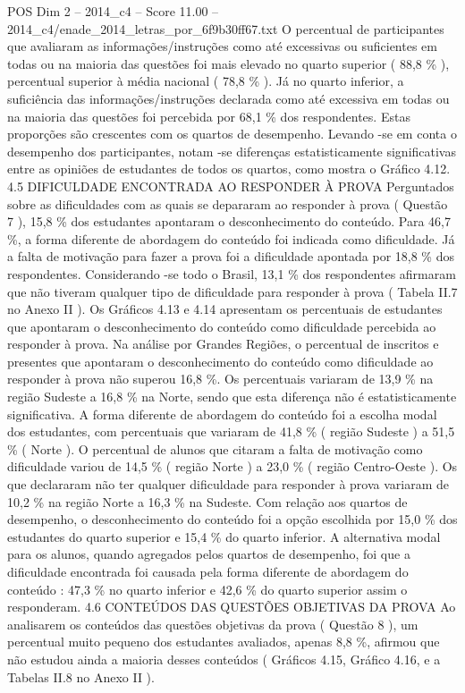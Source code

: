 \begin{textsample}{POS Dim 2 – 2014\_c4 – Score 11.00 – 2014\_c4/enade\_2014\_letras\_por\_6f9b30ff67.txt}
O percentual de participantes que avaliaram as informações/instruções como até excessivas ou suficientes em todas ou na maioria das questões foi mais elevado no quarto superior ( 88,8 \% ), percentual superior à média nacional ( 78,8 \% ).
Já no quarto inferior, a suficiência das informações/instruções declarada como até excessiva em todas ou na maioria das questões foi percebida por 68,1 \% dos respondentes.
Estas proporções são crescentes com os quartos de desempenho.
Levando -se em conta o desempenho dos participantes, notam -se diferenças estatisticamente significativas entre as opiniões de estudantes de todos os quartos, como mostra o Gráfico 4.12. 4.5 DIFICULDADE ENCONTRADA AO RESPONDER À PROVA Perguntados sobre as dificuldades com as quais se depararam ao responder à prova ( Questão 7 ), 15,8 \% dos estudantes apontaram o desconhecimento do conteúdo.
Para 46,7 \%, a forma diferente de abordagem do conteúdo foi indicada como dificuldade.
Já a falta de motivação para fazer a prova foi a dificuldade apontada por 18,8 \% dos respondentes.
Considerando -se todo o Brasil, 13,1 \% dos respondentes afirmaram que não tiveram qualquer tipo de dificuldade para responder à prova ( Tabela II.7 no Anexo II ).
Os Gráficos 4.13 e 4.14 apresentam os percentuais de estudantes que apontaram o desconhecimento do conteúdo como dificuldade percebida ao responder à prova.
Na análise por Grandes Regiões, o percentual de inscritos e presentes que apontaram o desconhecimento do conteúdo como dificuldade ao responder à prova não superou 16,8 \%.
Os percentuais variaram de 13,9 \% na região Sudeste a 16,8 \% na Norte, sendo que esta diferença não é estatisticamente significativa.
A forma diferente de abordagem do conteúdo foi a escolha modal dos estudantes, com percentuais que variaram de 41,8 \% ( região Sudeste ) a 51,5 \% ( Norte ).
O percentual de alunos que citaram a falta de motivação como dificuldade variou de 14,5 \% ( região Norte ) a 23,0 \% ( região Centro-Oeste ).
Os que declararam não ter qualquer dificuldade para responder à prova variaram de 10,2 \% na região Norte a 16,3 \% na Sudeste.
Com relação aos quartos de desempenho, o desconhecimento do conteúdo foi a opção escolhida por 15,0 \% dos estudantes do quarto superior e 15,4 \% do quarto inferior.
A alternativa modal para os alunos, quando agregados pelos quartos de desempenho, foi que a dificuldade encontrada foi causada pela forma diferente de abordagem do conteúdo : 47,3 \% no quarto inferior e 42,6 \% do quarto superior assim o responderam. 4.6 CONTEÚDOS DAS QUESTÕES OBJETIVAS DA PROVA Ao analisarem os conteúdos das questões objetivas da prova ( Questão 8 ), um percentual muito pequeno dos estudantes avaliados, apenas 8,8 \%, afirmou que não estudou ainda a maioria desses conteúdos ( Gráficos 4.15, Gráfico 4.16, e a Tabelas II.8 no Anexo II ).

\end{textsample}
